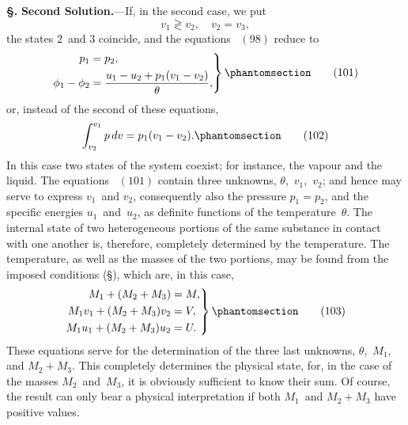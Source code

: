 \documentclass[12pt]{book}[2005/09/16]
\newcommand{\Chg}[2]{#2}
\newcommand{\Add}[1]{\Chg{}{#1}}
\newcommand{\Section}[1]{
  \medskip\par\textbf{§\;#1}
  \label{section:#1}
}
\newcommand{\SecRef}[2][§\;]{\hyperref[section:#2.]{{\upshape #1#2}}}
\newcommand{\Tag}[1]{%
  \phantomsection\label{eqn:#1}\tag*{\ensuremath{#1}}%
}
\newcommand{\Eq}[1]{%
  \hyperref[eqn:#1]{\ensuremath{#1}}%
}
\newcommand{\PageSep}[1]{\ignorespaces}
\newcommand{\Topic}[1]{\textbf{#1}}
\begin{document}
\Section{171.} \Topic{Second Solution.}---If, in the second case, we put
\[
v_{1} \gtrless v_{2},\quad v_{2} = v_{3},
\]
the states $2$~and $3$ coincide, and the equations~\Eq{(98)} reduce to
\[
\left.
\begin{aligned}
p_{1} &= p_{2}\Add{,} \\
\phi_{1} - \phi_{2} &= \frac{u_{1} - u_{2} + p_{1}(v_{1} - v_{2})}{\theta}\Add{,}
\end{aligned}
\right\}
\Tag{(101)}
\]
\PageSep{139}
or, instead of the second of these equations,
\[
\int_{v_{2}}^{v_{1}} p\, dv = p_{1} (v_{1} - v_{2})\Add{.}
\Tag{(102)}
\]
In this case two states of the system coexist; for instance,
the vapour and the liquid. The equations~\Eq{(101)} contain
three unknowns, $\theta$,~$v_{1}$,~$v_{2}$; and hence may serve to express $v_{1}$~and
$v_{2}$, consequently also the pressure $p_{1} = p_{2}$, and the
specific energies $u_{1}$~and~$u_{2}$, as definite functions of the
temperature~$\theta$. The internal state of two heterogeneous
portions of the same substance in contact with one another
is, therefore, completely determined by the temperature.
The temperature, as well as the masses of the two portions,
may be found from the imposed conditions (\SecRef{166}), which
are, in this case,
\[
\left.
\begin{aligned}
M_{1} + (M_{2} + M_{3}) &= M\Add{,} \\
M_{1} v_{1} + (M_{2} + M_{3}) v_{2} &= V\Add{,} \\
M_{1} u_{1} + (M_{2} + M_{3}) u_{2} &= U\Add{.} \\
\end{aligned}
\right\}
\Tag{(103)}
\]
These equations serve for the determination of the three
last unknowns, $\theta$,~$M_{1}$, and $M_{2} + M_{3}$. This completely
determines the physical state, for, in the case of the masses
$M_{2}$~and~$M_{3}$, it is obviously sufficient to know their sum.
Of course, the result can only bear a physical interpretation
if both $M_{1}$~and $M_{2} + M_{3}$ have positive values.
\end{document}
